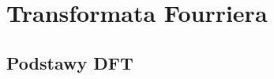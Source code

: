 \documentclass[12pt,titlepage]{report}
\begin{document}
\section{Transformata Fourriera}

\subsection{Podstawy DFT} 
\begin{figure}[!h]
	\centering
	\par
	\subfloat[]{
}
\end{figure}
\end{document}
